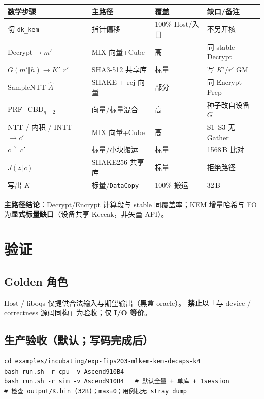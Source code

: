 \documentclass[UTF8,a4paper,11pt]{ctexart}
\begin{document}
\begin{longtable}{@{}L{3.8cm}L{3.6cm}L{1.4cm}L{4.0cm}@{}}
\toprule
数学步骤 & 主路径 & 覆盖 & 缺口/备注 \\
\midrule
切 \texttt{dk\_kem} & 指针偏移 & 100\% Host/入口 & 不另开核 \\
Decrypt$\to m'$ & MIX 向量+Cube & 高 & 同 stable Decrypt \\
$G(m'\Vert h)\to K'\Vert r'$ & SHA3-512 共享库 & 标量 & 写 $K'$/$r'$ GM \\
SampleNTT $\hat{A}$ & SHAKE + rej 向量 & 部分 & 同 Encrypt Prep \\
PRF+CBD$_{\eta=2}$ & 向量/标量混合 & 高 & 种子改自设备 $G$ \\
NTT / 内积 / INTT$\to c'$ & MIX 向量+Cube & 高 & S1--S3 无 Gather \\
$c\stackrel{?}{=}c'$ & 标量/小块搬运 & 标量 & 1568\,B 比对 \\
$J(z\Vert c)$ & SHAKE256 共享库 & 标量 & 拒绝路径 \\
写出 $K$ & 标量/\texttt{DataCopy} & 100\% 搬运 & 32\,B \\
\bottomrule
\end{longtable}

\textbf{主路径结论}：Decrypt/Encrypt 计算段与 stable 同覆盖率；KEM 增量哈希与 FO
为\textbf{显式标量缺口}（设备共享 Keccak，非矢量 API）。

\section{验证}
\label{sec:verify}

\subsection{Golden 角色}

Host / liboqs 仅提供合法输入与期望输出（黑盒 oracle）。
\textbf{禁止}以「与 device / correctness 源码同构」为验收；仅 \textbf{I/O 等价}。

\subsection{生产验收（默认；写码完成后）}

\begin{verbatim}
cd examples/incubating/exp-fips203-mlkem-kem-decaps-k4
bash run.sh -r cpu -v Ascend910B4
bash run.sh -r sim -v Ascend910B4   # 默认全量 + 单库 + 1session
# 检查 output/K.bin (32B)；max=0；用例根无 stray dump
\end{verbatim}
\end{document}
